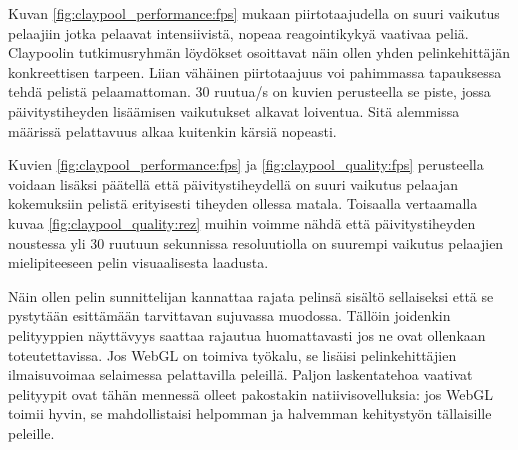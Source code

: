 Kuvan \ref{fig:claypool_performance:fps} mukaan piirtotaajudella on suuri vaikutus pelaajiin jotka pelaavat intensiivistä, nopeaa reagointikykyä vaativaa peliä. Claypoolin tutkimusryhmän löydökset\cite{claypool_fps} osoittavat näin ollen yhden pelinkehittäjän konkreettisen tarpeen. Liian vähäinen piirtotaajuus voi pahimmassa tapauksessa tehdä pelistä pelaamattoman. 30 ruutua/s on kuvien perusteella se piste, jossa päivitystiheyden lisäämisen vaikutukset alkavat loiventua. Sitä alemmissa määrissä pelattavuus alkaa kuitenkin kärsiä nopeasti.  

Kuvien \ref{fig:claypool_performance:fps} ja \ref{fig:claypool_quality:fps} perusteella voidaan lisäksi päätellä että päivitystiheydellä on suuri vaikutus pelaajan kokemuksiin pelistä erityisesti tiheyden ollessa matala. Toisaalla vertaamalla kuvaa \ref{fig:claypool_quality:rez} muihin voimme nähdä että päivitystiheyden noustessa yli 30 ruutuun sekunnissa resoluutiolla on suurempi vaikutus pelaajien mielipiteeseen pelin visuaalisesta laadusta\cite{claypool_fps}. 

Näin ollen pelin sunnittelijan kannattaa rajata pelinsä sisältö sellaiseksi että se pystytään esittämään tarvittavan sujuvassa muodossa. Tällöin joidenkin pelityyppien näyttävyys saattaa rajautua huomattavasti jos ne ovat ollenkaan toteutettavissa. Jos WebGL on toimiva työkalu, se lisäisi pelinkehittäjien ilmaisuvoimaa selaimessa pelattavilla peleillä. Paljon laskentatehoa vaativat pelityypit ovat tähän mennessä olleet pakostakin natiivisovelluksia: jos WebGL toimii hyvin, se mahdollistaisi helpomman ja halvemman kehitystyön tällaisille peleille.